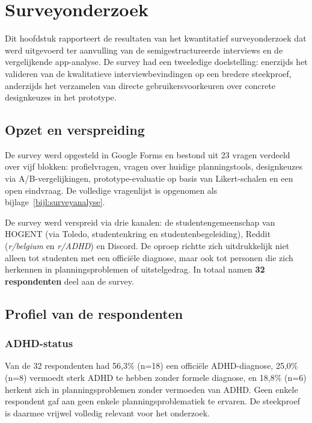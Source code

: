 
\chapter{Surveyonderzoek}%
\label{ch:surveyanalyse}

Dit hoofdstuk rapporteert de resultaten van het kwantitatief surveyonderzoek dat
werd uitgevoerd ter aanvulling van de semigestructureerde interviews en de
vergelijkende app-analyse. De survey had een tweeledige doelstelling: enerzijds
het valideren van de kwalitatieve interviewbevindingen op een bredere steekproef,
anderzijds het verzamelen van directe gebruikersvoorkeuren over concrete
designkeuzes in het prototype.

\section{Opzet en verspreiding}

De survey werd opgesteld in Google Forms en bestond uit 23 vragen verdeeld over
vijf blokken: profielvragen, vragen over huidige planningstools, designkeuzes via
A/B-vergelijkingen, prototype-evaluatie op basis van Likert-schalen en een open
eindvraag. De volledige vragenlijst is opgenomen als bijlage~\ref{bijl:surveyanalyse}.

De survey werd verspreid via drie kanalen: de studentengemeenschap van HOGENT
(via Toledo, studentenkring en studentenbegeleiding), Reddit (\textit{r/belgium}
en \textit{r/ADHD}) en Discord. De oproep richtte zich uitdrukkelijk niet alleen
tot studenten met een officiële diagnose, maar ook tot personen die zich herkennen
in planningsproblemen of uitstelgedrag. In totaal namen \textbf{32 respondenten}
deel aan de survey.

\section{Profiel van de respondenten}

\subsection{ADHD-status}

Van de 32 respondenten had 56,3\% (n=18) een officiële ADHD-diagnose, 25,0\%
(n=8) vermoedt sterk ADHD te hebben zonder formele diagnose, en 18,8\% (n=6)
herkent zich in planningsproblemen zonder vermoeden van ADHD. Geen enkele
respondent gaf aan geen enkele planningsproblematiek te ervaren. De steekproef
is daarmee vrijwel volledig relevant voor het onderzoek.

